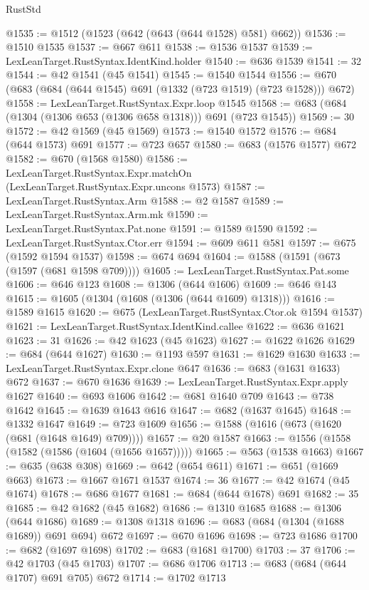 \begin{lexlean}{RustStd}
\begin{coremodule}
@1535 := @1512 (@1523 (@642 (@643 (@644 @1528) @581) @662))
@1536 := @1510 @1535
@1537 := @667 @611
@1538 := @1536 @1537
@1539 := LexLeanTarget.RustSyntax.IdentKind.holder
@1540 := @636 @1539
@1541 := 32
@1544 := @42 @1541 (@45 @1541)
@1545 := @1540 @1544
@1556 := @670 (@683 (@684 (@644 @1545) @691 (@1332 (@723 @1519) (@723 @1528))) @672)
@1558 := LexLeanTarget.RustSyntax.Expr.loop @1545
@1568 := @683 (@684 (@1304 (@1306 @653 (@1306 @658 @1318))) @691 (@723 @1545))
@1569 := 30
@1572 := @42 @1569 (@45 @1569)
@1573 := @1540 @1572
@1576 := @684 (@644 @1573) @691
@1577 := @723 @657
@1580 := @683 (@1576 @1577) @672
@1582 := @670 (@1568 @1580)
@1586 := LexLeanTarget.RustSyntax.Expr.matchOn (LexLeanTarget.RustSyntax.Expr.uncons @1573)
@1587 := LexLeanTarget.RustSyntax.Arm
@1588 := @2 @1587
@1589 := LexLeanTarget.RustSyntax.Arm.mk
@1590 := LexLeanTarget.RustSyntax.Pat.none
@1591 := @1589 @1590
@1592 := LexLeanTarget.RustSyntax.Ctor.err
@1594 := @609 @611 @581
@1597 := @675 (@1592 @1594 @1537)
@1598 := @674 @694
@1604 := @1588 (@1591 (@673 (@1597 (@681 @1598 @709))))
@1605 := LexLeanTarget.RustSyntax.Pat.some
@1606 := @646 @123
@1608 := @1306 (@644 @1606)
@1609 := @646 @143
@1615 := @1605 (@1304 (@1608 (@1306 (@644 @1609) @1318)))
@1616 := @1589 @1615
@1620 := @675 (LexLeanTarget.RustSyntax.Ctor.ok @1594 @1537)
@1621 := LexLeanTarget.RustSyntax.IdentKind.callee
@1622 := @636 @1621
@1623 := 31
@1626 := @42 @1623 (@45 @1623)
@1627 := @1622 @1626
@1629 := @684 (@644 @1627)
@1630 := @1193 @597
@1631 := @1629 @1630
@1633 := LexLeanTarget.RustSyntax.Expr.clone @647
@1636 := @683 (@1631 @1633) @672
@1637 := @670 @1636
@1639 := LexLeanTarget.RustSyntax.Expr.apply @1627
@1640 := @693 @1606
@1642 := @681 @1640 @709
@1643 := @738 @1642
@1645 := @1639 @1643 @616
@1647 := @682 (@1637 @1645)
@1648 := @1332 @1647
@1649 := @723 @1609
@1656 := @1588 (@1616 (@673 (@1620 (@681 (@1648 @1649) @709))))
@1657 := @20 @1587
@1663 := @1556 (@1558 (@1582 (@1586 (@1604 (@1656 @1657)))))
@1665 := @563 (@1538 @1663)
@1667 := @635 (@638 @308)
@1669 := @642 (@654 @611)
@1671 := @651 (@1669 @663)
@1673 := @1667 @1671 @1537
@1674 := 36
@1677 := @42 @1674 (@45 @1674)
@1678 := @686 @1677
@1681 := @684 (@644 @1678) @691
@1682 := 35
@1685 := @42 @1682 (@45 @1682)
@1686 := @1310 @1685
@1688 := @1306 (@644 @1686)
@1689 := @1308 @1318
@1696 := @683 (@684 (@1304 (@1688 @1689)) @691 @694) @672
@1697 := @670 @1696
@1698 := @723 @1686
@1700 := @682 (@1697 @1698)
@1702 := @683 (@1681 @1700)
@1703 := 37
@1706 := @42 @1703 (@45 @1703)
@1707 := @686 @1706
@1713 := @683 (@684 (@644 @1707) @691 @705) @672
@1714 := @1702 @1713

\end{coremodule}
\end{lexlean}
